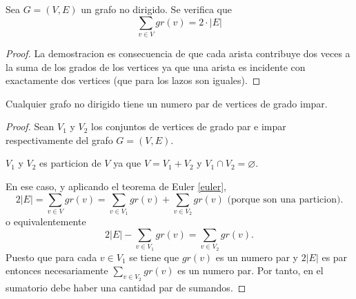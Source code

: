 \begin{theorem}[de Euler]
	\label{euler}
	Sea \(G = (V,E )\) un grafo no dirigido. Se verifica que
	\[
		\sum_{v \in  V } gr(v) = 2 \cdot |E|
	\]
\end{theorem}
\begin{proof}
	La demostracion es consecuencia de que cada arista contribuye dos veces a la suma de los grados de los vertices ya que una arista es incidente con exactamente dos vertices (que para los lazos son iguales).
\end{proof}

\begin{corollary}
	Cualquier grafo no dirigido tiene un numero par de vertices de grado impar.
\end{corollary}
\begin{proof}
	Sean \(V_1 \) y \(V_2 \) los conjuntos de vertices de grado par e impar respectivamente del grafo \(G = (V,E )\).
	
	\(V_1 \) y \(V_2 \) es particion de \(V \) ya que \(V = V_1 + V_2\) y \(V_1 \cap V_2 = \varnothing\).
	
	En ese caso, y aplicando el teorema de Euler \eqref{euler},
	\[
		2 |E| = \sum_{v \in V } gr (v) = \sum_{v \in V_1 } gr(v) + \sum_{v \in V_2 } gr(v) \text{ (porque son una particion).}
	\]
	o equivalentemente
	\[
		2 |E| - \sum_{v \in V_1 } gr(v) = \sum_{v \in V_2} gr(v).
	\]
	Puesto que para cada \(v \in V_1 \) se tiene que \(gr(v )\) es un numero par y \(2|E| \) es par entonces necesariamente \(\sum\nolimits_{v \in V_2 }	gr(v) \) es un numero par. Por tanto, en el sumatorio debe haber una cantidad par de sumandos.
\end{proof}

